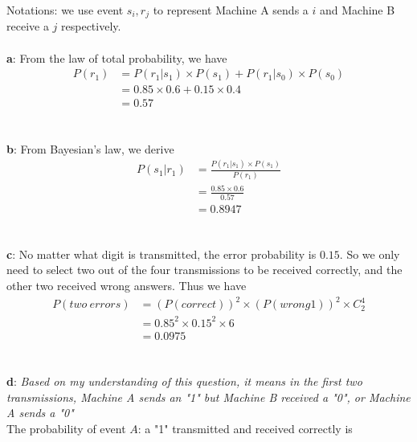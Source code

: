 \documentclass[12pt,letterpaper]{article}
\begin{document}
    Notations: we use event $s_i, r_j$ to represent Machine A sends a $i$ and Machine B receive a $j$ respectively.
    \\ \\
    \textbf{a}: From the law of total probability, we have
        \begin{equation}
            \begin{aligned}
                P(r_1) &= P(r_1 | s_1) \times P(s_1) + P(r_1 | s_0) \times P(s_0) \\
                &= 0.85 \times 0.6 + 0.15 \times 0.4 \\
                &= 0.57
            \end{aligned}
        \end{equation}
    \\ \\
    \textbf{b}: From Bayesian's law, we derive
        \begin{equation}
            \begin{aligned}
                P(s_1 | r_1) &= \frac{P(r_1 | s_1) \times P(s_1)}{P(r_1)} \\
                &= \frac{0.85 \times 0.6}{0.57} \\
                &= 0.8947
            \end{aligned}
        \end{equation}
    \\ \\
    \textbf{c}: No matter what digit is transmitted, the error probability is $0.15$. So we only need to select two out of the four transmissions to be received correctly, and the other two received wrong answers. Thus we have
        \begin{equation}
            \begin{aligned}
                P(two\ errors) &= (P(correct))^2 \times (P(wrong1))^2 \times C_{2}^{4} \\
                &= 0.85^2 \times 0.15^2 \times 6 \\
                &= 0.0975
            \end{aligned}
        \end{equation}
    \\ \\
    \textbf{d}: \textit{Based on my understanding of this question, it means in the first two transmissions, Machine A sends an "1" but Machine B received a "0", or Machine A sends a "0"} \\
    The probability of event $A$: a "1" transmitted and received correctly is
\end{document}
